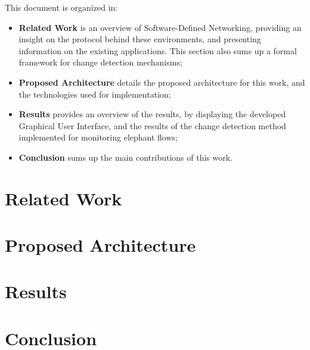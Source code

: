 \documentclass[a4paper]{IEEEtran}
\begin{document}
\par This document is organized in:

\begin{itemize}
    \item \textbf{Related Work} is an overview of Software-Defined Networking, providing an insight on the protocol behind these environments,
and presenting information on the existing applications. This section also sums up a formal framework for change detection mechanisms;

    \item \textbf{Proposed Architecture} details the proposed architecture for this work, and the technologies used for implementation;

    \item \textbf{Results} provides an overview of the results, by displaying the developed Graphical User Interface, and the results of the change detection method
        implemented for monitoring elephant flows;

    \item \textbf{Conclusion} sums up the main contributions of this work.
\end{itemize}

\section{Related Work}

\section{Proposed Architecture}

\section{Results}

\section{Conclusion}



\end{document}
